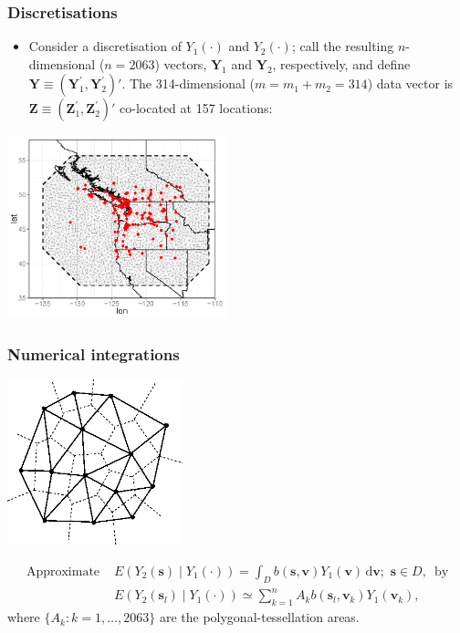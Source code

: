 \documentclass{beamer}
\newcommand{\svec} {\textbf{s}}
\newcommand{\s}{\mathbf{s}}
\renewcommand{\v}{\mathbf{v}}
\renewcommand{\d}{\mathrm{d}}
\newcommand{\Yvec}{\mathbf{Y}}
\newcommand{\Zvec}{\mathbf{Z}}
\newcommand{\E}{E}
\begin{document}
\begin{frame}
\frametitle{Discretisations}
\begin{itemize}
\item Consider a discretisation of $Y_1(\cdot)$ and $Y_2(\cdot)$; call the resulting $n$-dimensional ($n=2063$) vectors, $\Yvec_1$ and $\Yvec_2$, respectively, and define $\Yvec \equiv (\Yvec_1^{\prime},\Yvec_2^{\prime})'$. The 314-dimensional ($m=m_1+m_2=314$) data vector is $\Zvec \equiv (\Zvec_1^{\prime},\Zvec_2^{\prime})'$ co-located at 157 locations:
\end{itemize}

\vspace{-0.15in}
\begin{center}
\includegraphics[width=2.5in]{meshplot2.png}
\end{center}

\end{frame}



\begin{frame}
\frametitle{Numerical integrations}

\vspace{-.8cm}
\begin{center}
\includegraphics[width=2in]{vor3.png}
\end{center}
\vspace{-.5cm}
\begin{align*}
\mbox{Approximate }&\displaystyle \E\left(Y_2(\s)\mid Y_1(\cdot)\right)=\int_D{b(\s,\v)Y_1(\v)\,\d \v};\,\,\s\in D,\,\mbox{ by}\\
&\E(Y_2(\svec_l) \mid  Y_1(\cdot)) \simeq \sum_{k=1}^{n} A_k b(\svec_l,\v_k)Y_1(\v_k),
\end{align*}
where $\{A_k:k=1,\ldots,2063\}$ are the polygonal-tessellation areas.
\end{frame}
\end{document}
